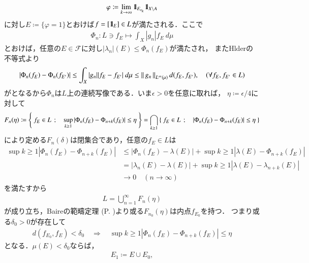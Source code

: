 \begin{prf}
\begin{description}
\begin{align}
					\varphi \coloneqq \lim_{k \to \infty} \mbox{1}\hspace{-0.25em}\mbox{l}_{E_{n_k}} \mbox{1}\hspace{-0.25em}\mbox{l}_{X \backslash A}
				\end{align}
				に対し$E \coloneqq \{\varphi = 1\}$とおけば$f = [\mbox{1}\hspace{-0.25em}\mbox{l}_E] \in L$が満たされる．ここで
				\begin{align}
					\Phi_n: L \ni f_E \longmapsto \int_X |g_n| f_E\ d\mu
				\end{align}
				とおけば，任意の$E \in \mathscr{F}$に対し$|\lambda_n|(E) \leq \Phi_n(f_E)$が満たされ，
				またHlderの不等式より
				\begin{align}
					\left| \Phi_n(f_E) - \Phi_n(f_{E'}) \right|
					\leq \int_X |g_n| |f_E - f_{E'}|\ d\mu
					\leq \left\|\, g_n\, \right\|_{L^\infty(\mu)} d(f_E,f_{E'}),
					\quad (\forall f_E,f_{E'} \in L)
				\end{align}
				がとなるから$\Phi_n$は$L$上の連続写像である．いま$\epsilon > 0$を任意に取れば，
				$\eta \coloneqq \epsilon/4$に対して
				\begin{align}
					F_n(\eta) 
					\coloneqq \left\{\ f_E \in L\ \, ; \quad \operatorname*{sup}_{k \geq 1} \left| \Phi_n(f_E)-\Phi_{n+k}(f_E) \right| \leq \eta\ \right\}
					= \bigcap_{k \geq 1} \left\{\ f_E \in L\ \, ; \quad \left| \Phi_n(f_E)-\Phi_{n+k}(f_E) \right| \leq \eta\ \right\}
				\end{align}
				により定める$F_n(\delta)$は閉集合であり，任意の$f_E \in L$は
				\begin{align}
					\sup{k \geq 1}{\left| \Phi_n(f_E)-\Phi_{n+k}(f_E) \right|}
					&\leq \left| \Phi_n(f_E)-\lambda(E) \right|
						+ \sup{k \geq 1}{\left| \lambda(E)-\Phi_{n+k}(f_E) \right|} \\
					&= \left| \lambda_n(E)-\lambda(E) \right|
						+ \sup{k \geq 1}{\left| \lambda(E)-\lambda_{n+k}(E) \right|} \\
					&\longrightarrow 0 \quad (n \longrightarrow \infty)
				\end{align}
				を満たすから
				\begin{align}
					L = \bigcup_{n=1}^\infty F_n(\eta)
				\end{align}
				が成り立ち，Baireの範疇定理
				(P. \pageref{thm:Baire_category_theorem})より或る$F_{n_0}(\eta)$は内点$f_{E_0}$を持つ．
				つまり或る$\delta_0 > 0$が存在して
				\begin{align}
					d(f_{E_0},f_E) < \delta_0
					\quad \Rightarrow \quad
					\sup{k \geq 1}{\left| \Phi_n(f_E)-\Phi_{n+k}(f_E) \right|} \leq \eta
				\end{align}
				となる．$\mu(E) < \delta_0$ならば，
				\begin{align}
					E_1 \coloneqq E \cup E_0,

\end{align}
\end{description}
\end{prf}
